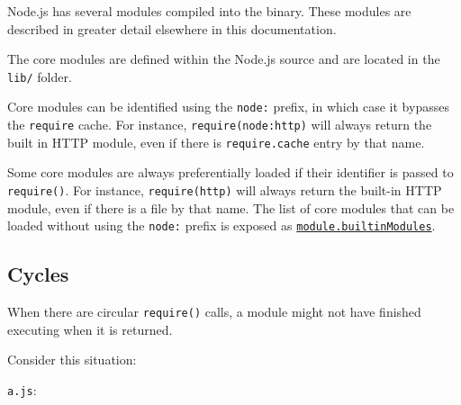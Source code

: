 Node.js has several modules compiled into the binary. These modules are
described in greater detail elsewhere in this documentation.

The core modules are defined within the Node.js source and are located
in the \texttt{lib/} folder.

Core modules can be identified using the \texttt{node:} prefix, in which
case it bypasses the \texttt{require} cache. For instance,
\texttt{require(\textquotesingle{}node:http\textquotesingle{})} will
always return the built in HTTP module, even if there is
\texttt{require.cache} entry by that name.

Some core modules are always preferentially loaded if their identifier
is passed to \texttt{require()}. For instance,
\texttt{require(\textquotesingle{}http\textquotesingle{})} will always
return the built-in HTTP module, even if there is a file by that name.
The list of core modules that can be loaded without using the
\texttt{node:} prefix is exposed as
\href{module.md\#modulebuiltinmodules}{\texttt{module.builtinModules}}.

\subsection{Cycles}\label{cycles}

When there are circular \texttt{require()} calls, a module might not
have finished executing when it is returned.

Consider this situation:

\texttt{a.js}:

\begin{Shaded}
\begin{Highlighting}[]
\NormalTok{(}\NormalTok{)}\OperatorTok{;}
 \OperatorTok{=} \OperatorTok{;}
\OperatorTok{=} \NormalTok{(}\NormalTok{)}\OperatorTok{;}
\NormalTok{(}\OperatorTok{,}\NormalTok{)}\OperatorTok{;}
 \OperatorTok{=} \OperatorTok{;}
\NormalTok{(}\NormalTok{)}\OperatorTok{;}
\end{Highlighting}
\end{Shaded}

